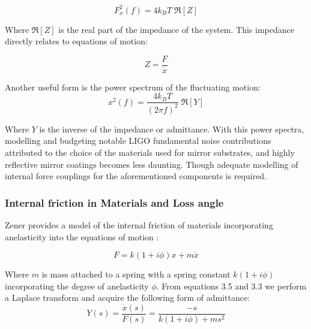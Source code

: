


\begin{equation}
F_x^2(f) = 4 k_B T\; \Re[Z]
\end{equation}

 \noindent Where $\Re[Z]$ is the real part of the impedance of the system. This impedance directly relates to equations of motion:

 \begin{equation}
 Z = \frac{F}{\dot{x}}
 \end{equation}

\noindent Another useful form is the power spectrum of the fluctuating motion:
\begin{equation}\label{fdtpsd}
x^2 (f)  = \frac{4k_B T}{(2 \pi f)^2}\; \Re[Y]
\end{equation}

Where $Y$ is the inverse of the impedance or admittance. With this power spectra, modelling and budgeting notable LIGO fundamental noise contributions attributed to the choice of the materials used for mirror substrates, and highly reflective mirror coatings becomes less daunting. Though adequate modelling of internal force couplings for the aforementioned components is required.

\subsubsection{Internal friction in Materials and Loss angle}

Zener provides a model of the internal friction of materials incorporating anelasticity into the equations of motion \cite{zener:1948}:

\begin{equation}
F = k(1+i\phi)x + m\ddot{x}
\end{equation}

Where $m$ is mass attached to a spring with a spring constant $k(1+ i\phi)$ incorporating the degree of anelasticity $\phi$. From equations 3.5 and 3.3 we perform a Laplace transform and acquire the following form of admittance:
\begin{equation}
Y(s) = \frac{\dot{x}(s)}{F(s)} = \frac{-s}{k(1+i\phi) + ms^2}
\end{equation}

